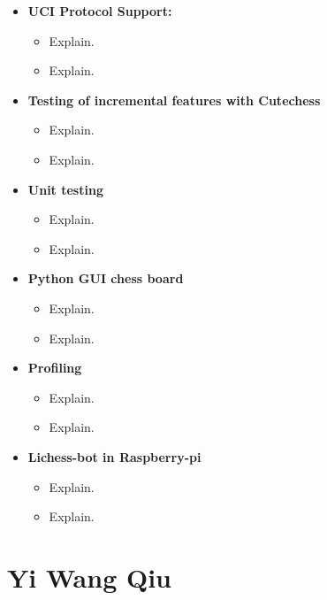 \begin{itemize}
    \item \textbf{UCI Protocol Support:}
    \begin{itemize}
        \item Explain.
        \item Explain.
    \end{itemize}
  
    \item \textbf{Testing of incremental features with Cutechess}
    \begin{itemize}
        \item Explain.
        \item Explain.
    \end{itemize}

    \item \textbf{Unit testing}
    \begin{itemize}
        \item Explain.
        \item Explain.
    \end{itemize}

    \item \textbf{Python GUI chess board}
    \begin{itemize}
        \item Explain.
        \item Explain.
    \end{itemize}

    \item \textbf{Profiling}
    \begin{itemize}
        \item Explain.
        \item Explain.
    \end{itemize}

    \item \textbf{Lichess-bot in Raspberry-pi}
    \begin{itemize}
        \item Explain.
        \item Explain.
    \end{itemize}
\end{itemize}

\section*{Yi Wang Qiu}

